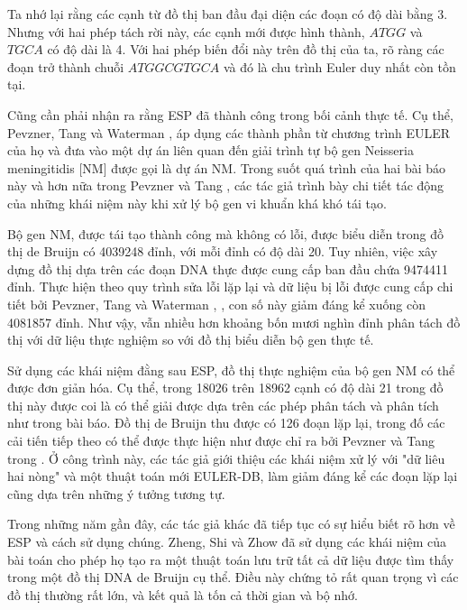 \documentclass[14pt, a4paper]{article}
\numberwithin{equation}{section}
\numberwithin{figure}{section}
\numberwithin{dl}{section}
\numberwithin{md}{section}
\numberwithin{bd}{section}
\numberwithin{dn}{section}
\numberwithin{hq}{section}
\begin{document}
    Ta nhớ lại rằng các cạnh từ đồ thị ban đầu đại diện các đoạn có độ dài bằng 3.
    Nhưng với hai phép tách rời này, các cạnh mới được hình thành, $ATGG$ và $TGCA$ có độ dài là 4.
    Với hai phép biến đổi này trên đồ thị của ta, rõ ràng các đoạn trở thành chuỗi $ATGGCGTGCA$ và đó là chu trình Euler duy nhất còn tồn tại.

    Cũng cần phải nhận ra rằng ESP đã thành công trong bối cảnh thực tế.
    Cụ thể, Pevzner, Tang và Waterman \cite{pevzner2001eulerian}, \cite{pevzner2001new} áp dụng các thành phần từ chương trình EULER của họ và đưa vào một dự án liên quan đến giải trình tự bộ gen Neisseria meningitidis [NM] được gọi là dự án NM.
    Trong suốt quá trình của hai bài báo này và hơn nữa trong Pevzner và Tang \cite{pevzner2001fragment}, các tác giả trình bày chi tiết tác động của những khái niệm này khi xử lý bộ gen vi khuẩn khá khó tái tạo.

    Bộ gen NM, được tái tạo thành công mà không có lỗi, được biểu diễn trong đồ thị de Bruijn có 4039248 đỉnh, với mỗi đỉnh có độ dài 20.
    Tuy nhiên, việc xây dựng đồ thị dựa trên các đoạn DNA thực được cung cấp ban đầu chứa 9474411 đỉnh.
    Thực hiện theo quy trình sửa lỗi lặp lại và dữ liệu bị lỗi được cung cấp chi tiết bởi Pevzner, Tang và Waterman \cite{pevzner2001eulerian}, \cite{pevzner2001new}, con số này giảm đáng kể xuống còn 4081857 đỉnh.
    Như vậy, vẫn nhiều hơn khoảng bốn mươi nghìn đỉnh phân tách đồ thị với dữ liệu thực nghiệm so với đồ thị biểu diễn bộ gen thực tế.

    Sử dụng các khái niệm đằng sau ESP, đồ thị thực nghiệm của bộ gen NM có thể được đơn giản hóa.
    Cụ thể, trong 18026 trên 18962 cạnh có độ dài 21 trong đồ thị này được coi là có thể giải được dựa trên các phép phân tách và phân tích như trong bài báo.
    Đồ thị de Bruijn thu được có 126 đoạn lặp lại, trong đố các cải tiến tiếp theo có thể được thực hiện như được chỉ ra bởi Pevzner và Tang trong \cite{pevzner2001fragment}.
    Ở công trình này, các tác giả giới thiệu các khái niệm xử lý với "dữ liêu hai nòng" và một thuật toán mới EULER-DB, làm giảm đáng kể các đoạn lặp lại cũng dựa trên những ý tưởng tương tự.

    Trong những năm gần đây, các tác giả khác đã tiếp tục có sự hiểu biết rõ hơn về ESP và cách sử dụng chúng.
    Zheng, Shi và Zhow \cite{zheng2004parallel} đã sử dụng các khái niệm của bài toán cho phép họ tạo ra một thuật toán lưu trữ tất cả dữ liệu được tìm thấy trong một đồ thị DNA de Bruijn cụ thể.
    Điều này chứng tỏ rất quan trọng vì các đồ thị thường rất lớn, và kết quả là tốn cả thời gian và bộ nhớ.
\end{document}
